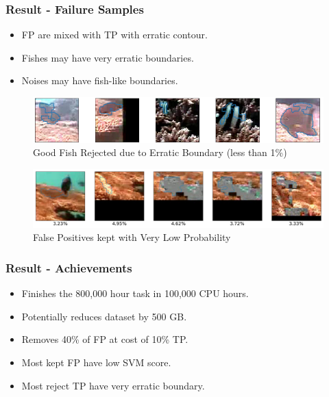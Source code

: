 \documentclass{beamer}[fullspacing]
\begin{document}
\begin{frame}
\frametitle{Result - Failure Samples}

\begin{itemize}
\item
FP are mixed with TP with erratic contour.
\item
Fishes may have very erratic boundaries.
\item
Noises may have fish-like boundaries.
\end{itemize}

\begin{figure}
\setlength{\abovecaptionskip}{-2pt}
\includegraphics[scale=0.35]{image/SVMfail.png}
\caption{Good Fish Rejected due to Erratic Boundary (less than 1\%)}
\end{figure}
\vspace{-10pt}

\begin{figure}
\setlength{\abovecaptionskip}{-2pt}
\includegraphics[scale=0.25]{image/LLP.png}
\caption{False Positives kept with Very Low Probability}
\end{figure}

\end{frame}




\begin{frame}
\frametitle{Result - Achievements}

\begin{itemize}
\item
Finishes the 800,000 hour task in 100,000 CPU hours.
\item
Potentially reduces dataset by 500 GB.
\item 
Removes 40\% of FP at cost of 10\% TP.
\item
Most kept FP have low SVM score.
\item
Most reject TP have very erratic boundary.
\end{itemize}


\end{frame}
\end{document}
